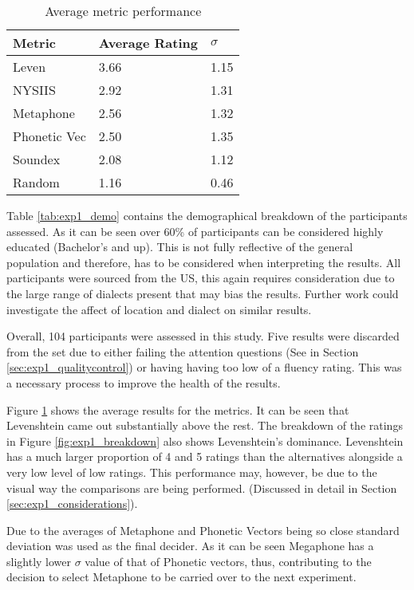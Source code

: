 \begin{table}[h!]
    \centering
    \begin{tabular}{|l|l|l|}
        \hline
        Metric & Average Rating  & $\sigma$\\
        \hline
        Leven     & 3.66  & 1.15\\
        NYSIIS    & 2.92 & 1.31\\
        Metaphone & 2.56 & 1.32\\
        Phonetic Vec & 2.50 & 1.35\\
        Soundex & 2.08 & 1.12 \\
        \hline
        Random  & 1.16 & 0.46\\
        \hline
    \end{tabular}
    \caption{Average metric performance}
    \label{tab:exp1_results}
\end{table}

Table \ref{tab:exp1_demo} contains the demographical breakdown of the participants assessed. As it can be seen over 60\% of participants can be considered highly educated (Bachelor’s and up). This is not fully reflective of the general population and therefore, has to be considered when interpreting the results. All participants were sourced from the US, this again requires consideration due to the large range of dialects present that may bias the results. Further work could investigate the affect of location and dialect on similar results. 

Overall, 104 participants were assessed in this study. Five results were discarded from the set due to either failing the attention questions (See in Section \ref{sec:exp1_qualitycontrol}) or having having too low of a fluency rating. This was a necessary process to improve the health of the results. 

Figure \ref{tab:exp1_results} shows the average results for the metrics. It can be seen that Levenshtein came out substantially above the rest. The breakdown of the ratings in Figure \ref{fig:exp1_breakdown} also shows Levenshtein's dominance. Levenshtein has a much larger proportion of 4 and 5 ratings than the alternatives alongside a very low level of low ratings. This performance may, however, be due to the visual way the comparisons are being performed. (Discussed in detail in Section \ref{sec:exp1_considerations}). 

Due to the averages of Metaphone and Phonetic Vectors being so close standard deviation was used as the final decider. As it can be seen Megaphone has a slightly lower $\sigma$ value of that of Phonetic vectors, thus, contributing to the decision to select Metaphone to be carried over to the next experiment.

